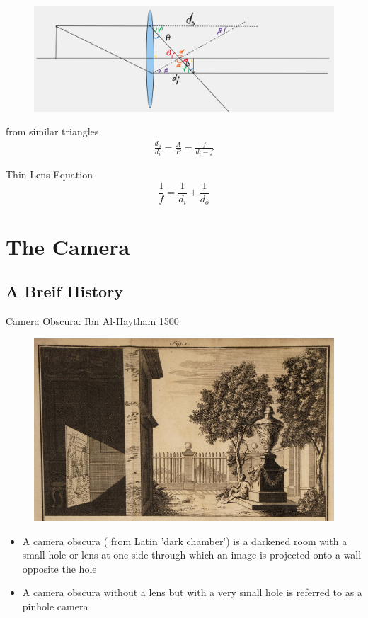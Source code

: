 \documentclass{beamer}
\begin{document}
\begin{frame}
	\begin{figure}
		\centering
		\includegraphics[scale=0.1]{60.png}
	\end{figure}
	from similar triangles
	\begin{align*}
		\frac{d_{o}}{d_{i}} = \frac{A}{B} = \frac{f}{d_{i} - f} 
	\end{align*}
	\begin{block}{Thin-Lens Equation}
		\begin{displaymath}
			\frac{1}{f} = \frac{1}{d_{i}} + \frac{1}{d_{o}}
		\end{displaymath}
		
	\end{block}
\end{frame}



\section{The Camera}
\subsection{A Breif History}
\begin{frame}{Camera Obscura: Ibn Al-Haytham 1500}
	\begin{figure}
		\centering
		\includegraphics[scale=0.4]{61.jpg}
	\end{figure}
	\begin{itemize}
		\item A camera obscura ( from Latin 'dark chamber') is a darkened room with a small hole or lens at one side through which an image is projected onto a wall opposite the hole
		\item A camera obscura without a lens but with a very small hole is referred to as a pinhole camera

	\end{itemize}
	
\end{frame}
\end{document}
